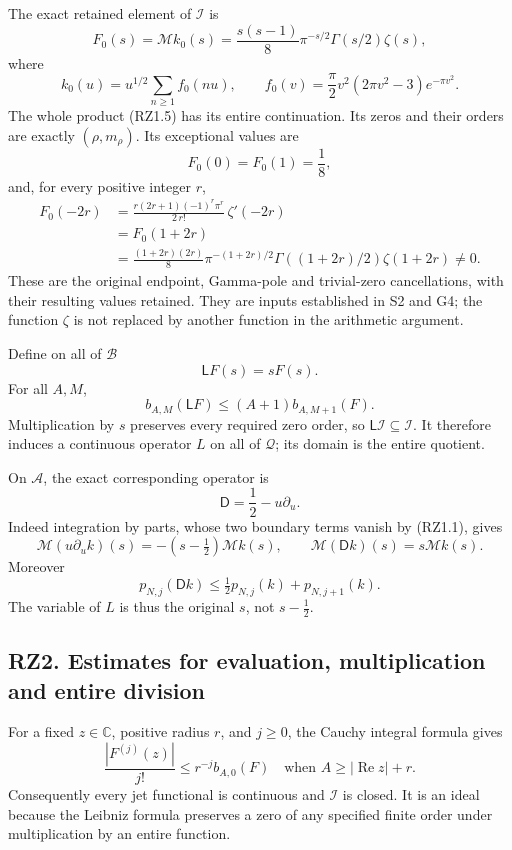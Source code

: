 \documentclass[
]{article}
\begin{document}
The exact retained element of \(\mathcal I\) is \[
F_0(s)=\mathcal Mk_0(s)
=\frac{s(s-1)}8\pi^{-s/2}\Gamma(s/2)\zeta(s),
\tag{RZ1.5}
\] where \[
k_0(u)=u^{1/2}\sum_{n\geq1}f_0(nu),\qquad
f_0(v)=\frac\pi2v^2(2\pi v^2-3)e^{-\pi v^2}.
\tag{RZ1.6}
\] The whole product (RZ1.5) has its entire continuation. Its zeros and
their orders are exactly \((\rho,m_\rho)\). Its exceptional values are
\[
F_0(0)=F_0(1)=\frac18,
\tag{RZ1.7}
\] and, for every positive integer \(r\), \[
\begin{aligned}
F_0(-2r)
&=\frac{r(2r+1)(-1)^r\pi^r}{2\,r!}\,\zeta'(-2r)\\
&=F_0(1+2r)\\
&=\frac{(1+2r)(2r)}8
\pi^{-(1+2r)/2}\Gamma((1+2r)/2)\zeta(1+2r)\ne0 .
\end{aligned}
\tag{RZ1.8}
\] These are the original endpoint, Gamma-pole and trivial-zero
cancellations, with their resulting values retained. They are inputs
established in S2 and G4; the function \(\zeta\) is not replaced by
another function in the arithmetic argument.

Define on all of \(\mathcal B\) \[
\mathsf L F(s)=sF(s).
\tag{RZ1.9}
\] For all \(A,M\), \[
b_{A,M}(\mathsf LF)\leq(A+1)b_{A,M+1}(F).
\tag{RZ1.10}
\] Multiplication by \(s\) preserves every required zero order, so
\(\mathsf L\mathcal I\subseteq\mathcal I\). It therefore induces a
continuous operator \(L\) on all of \(\mathcal Q\); its domain is the
entire quotient.

On \(\mathcal A\), the exact corresponding operator is \[
\mathsf D=\frac12-u\partial_u.
\tag{RZ1.11}
\] Indeed integration by parts, whose two boundary terms vanish by
(RZ1.1), gives \[
\mathcal M(u\partial_u k)(s)=-(s-\tfrac12)\mathcal Mk(s),
\qquad
\mathcal M(\mathsf Dk)(s)=s\mathcal Mk(s).
\tag{RZ1.12}
\] Moreover \[
p_{N,j}(\mathsf Dk)
\leq\tfrac12p_{N,j}(k)+p_{N,j+1}(k).
\tag{RZ1.13}
\] The variable of \(L\) is thus the original \(s\), not \(s-\tfrac12\).

\subsection{RZ2. Estimates for evaluation, multiplication and entire
division}\label{rz2.-estimates-for-evaluation-multiplication-and-entire-division}

For a fixed \(z\in\mathbb C\), positive radius \(r\), and \(j\geq0\),
the Cauchy integral formula gives \[
\frac{|F^{(j)}(z)|}{j!}
\leq r^{-j}b_{A,0}(F)
\quad\text{when }A\geq|\operatorname{Re}z|+r.
\tag{RZ2.1}
\] Consequently every jet functional is continuous and \(\mathcal I\) is
closed. It is an ideal because the Leibniz formula preserves a zero of
any specified finite order under multiplication by an entire function.
\end{document}
